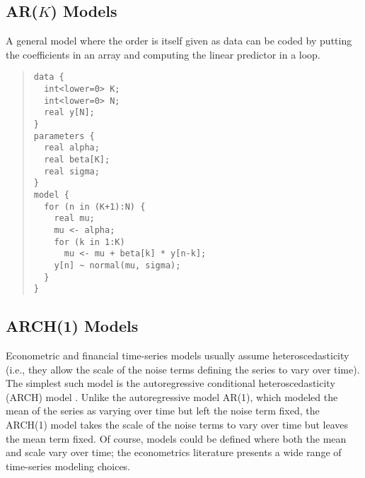 \subsection{AR($K$) Models}

A general model where the order is itself given as data can be coded
by putting the coefficients in an array and computing the linear
predictor in a loop.
%
\begin{quote}
\begin{Verbatim}[fontsize=\small]
data {
  int<lower=0> K;
  int<lower=0> N;
  real y[N];
}
parameters {
  real alpha;
  real beta[K];
  real sigma;
}
model {
  for (n in (K+1):N) {
    real mu;
    mu <- alpha;
    for (k in 1:K)
      mu <- mu + beta[k] * y[n-k];
    y[n] ~ normal(mu, sigma);
  }
}
\end{Verbatim}
\end{quote}

\subsection{ARCH(1) Models}

Econometric and financial time-series models usually assume
heteroscedasticity (i.e., they allow the scale of the noise terms
defining the series to vary over time).
The simplest such model is the autoregressive conditional
heteroscedasticity (ARCH) model \citep{Engle:1982}.  Unlike the
autoregressive model AR(1), which modeled the mean of the series as
varying over time but left the noise term fixed, the ARCH(1) model
takes the scale of the noise terms to vary over time but leaves the
mean term fixed.  Of course, models could be defined where both the
mean and scale vary over time; the econometrics literature presents a
wide range of time-series modeling choices.

